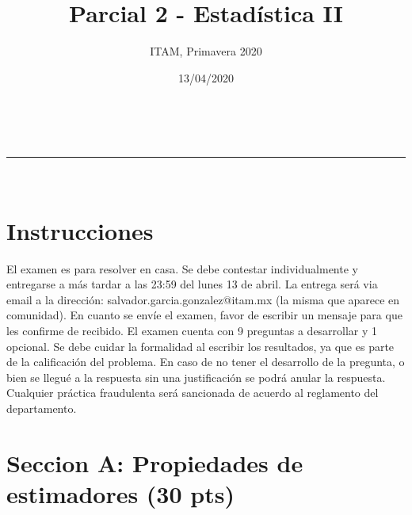 \documentclass[addpoints]{exam}
\makeatletter
\newcommand{\linia}{\rule{\linewidth}{0.5pt}}
\theoremstyle{mytheor}
\renewcommand{\maketitle}{
    \begin{center}
    \vspace{2ex}
    {\huge \textsc{\@title}}
    \vspace{1ex}
    \\
    \linia\\
    \@author \hfill \@date
    \vspace{4ex}
    \end{center}
  }
\makeatother
\begin{document}
  
  \title{Parcial 2 - Estadística II}
  
  \author{ITAM, Primavera 2020}
  
  \date{13/04/2020}
  
  \maketitle
  
  \section*{Instrucciones}
  
  El examen es para resolver en casa. Se debe contestar individualmente y entregarse a más tardar a las 23:59 del lunes 13 de abril. La entrega será via email a la dirección: salvador.garcia.gonzalez@itam.mx (la misma que aparece en comunidad). En cuanto se envíe el examen, favor de escribir un mensaje para que les confirme de recibido. El examen cuenta con 9 preguntas a desarrollar y 1 opcional. Se debe cuidar la formalidad al escribir los resultados, ya que es parte de la calificación del problema. En caso de no tener el desarrollo de la pregunta, o bien se llegué a la respuesta sin una justificación se podrá anular la respuesta. Cualquier práctica fraudulenta será sancionada de acuerdo al reglamento del departamento. 
  
  \vspace{10pt}
  
  \section*{Seccion A: Propiedades de estimadores (30 pts)}
 
\end{document}
